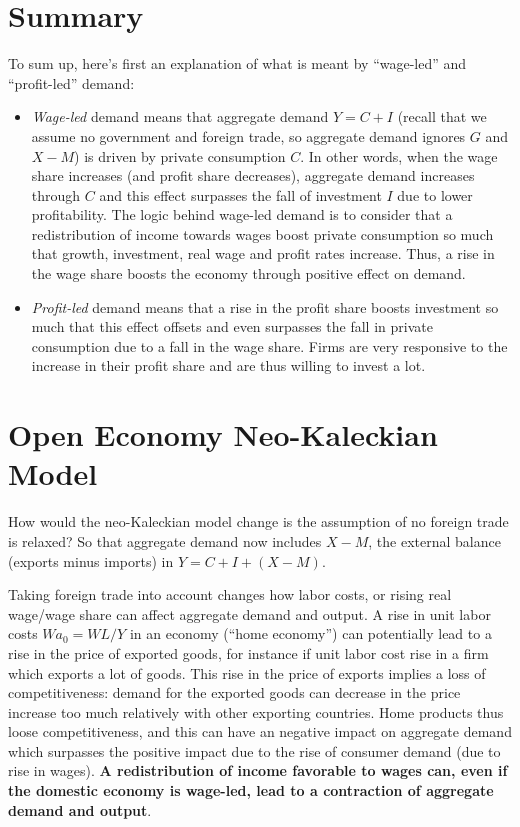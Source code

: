 \documentclass[
  letterpaper,
  DIV=11,
  numbers=noendperiod]{scrreprt}
\begin{document}
\hypertarget{summary}{%
\section{Summary}\label{summary}}

To sum up, here's first an explanation of what is meant by ``wage-led''
and ``profit-led'' demand:

\begin{itemize}
\item
  \emph{Wage-led} demand means that aggregate demand \(Y = C+I\) (recall
  that we assume no government and foreign trade, so aggregate demand
  ignores \(G\) and \(X-M\)) is driven by private consumption \(C\). In
  other words, when the wage share increases (and profit share
  decreases), aggregate demand increases through \(C\) and this effect
  surpasses the fall of investment \(I\) due to lower profitability. The
  logic behind wage-led demand is to consider that a redistribution of
  income towards wages boost private consumption so much that growth,
  investment, real wage and profit rates increase. Thus, a rise in the
  wage share boosts the economy through positive effect on demand.
\item
  \emph{Profit-led} demand means that a rise in the profit share boosts
  investment so much that this effect offsets and even surpasses the
  fall in private consumption due to a fall in the wage share. Firms are
  very responsive to the increase in their profit share and are thus
  willing to invest a lot.
\end{itemize}

\hypertarget{open-economy-neo-kaleckian-model}{%
\section{Open Economy Neo-Kaleckian
Model}\label{open-economy-neo-kaleckian-model}}

How would the neo-Kaleckian model change is the assumption of no foreign
trade is relaxed? So that aggregate demand now includes \(X-M\), the
external balance (exports minus imports) in \(Y = C+I+(X-M)\).

Taking foreign trade into account changes how labor costs, or rising
real wage/wage share can affect aggregate demand and output. A rise in
unit labor costs \(Wa_0=WL/Y\) in an economy (``home economy'') can
potentially lead to a rise in the price of exported goods, for instance
if unit labor cost rise in a firm which exports a lot of goods. This
rise in the price of exports implies a loss of competitiveness: demand
for the exported goods can decrease in the price increase too much
relatively with other exporting countries. Home products thus loose
competitiveness, and this can have an negative impact on aggregate
demand which surpasses the positive impact due to the rise of consumer
demand (due to rise in wages). \textbf{A redistribution of income
favorable to wages can, even if the domestic economy is wage-led, lead
to a contraction of aggregate demand and output}.
\end{document}
